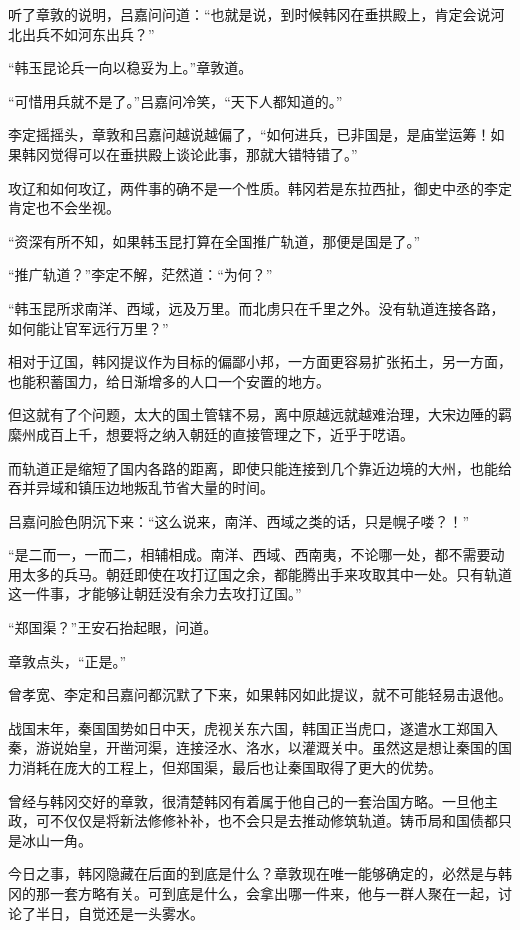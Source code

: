 听了章敦的说明，吕嘉问问道：“也就是说，到时候韩冈在垂拱殿上，肯定会说河北出兵不如河东出兵？”

“韩玉昆论兵一向以稳妥为上。”章敦道。

“可惜用兵就不是了。”吕嘉问冷笑，“天下人都知道的。”

李定摇摇头，章敦和吕嘉问越说越偏了，“如何进兵，已非国是，是庙堂运筹！如果韩冈觉得可以在垂拱殿上谈论此事，那就大错特错了。”

攻辽和如何攻辽，两件事的确不是一个性质。韩冈若是东拉西扯，御史中丞的李定肯定也不会坐视。

“资深有所不知，如果韩玉昆打算在全国推广轨道，那便是国是了。”

“推广轨道？”李定不解，茫然道：“为何？”

“韩玉昆所求南洋、西域，远及万里。而北虏只在千里之外。没有轨道连接各路，如何能让官军远行万里？”

相对于辽国，韩冈提议作为目标的偏鄙小邦，一方面更容易扩张拓土，另一方面，也能积蓄国力，给日渐增多的人口一个安置的地方。

但这就有了个问题，太大的国土管辖不易，离中原越远就越难治理，大宋边陲的羁縻州成百上千，想要将之纳入朝廷的直接管理之下，近乎于呓语。

而轨道正是缩短了国内各路的距离，即使只能连接到几个靠近边境的大州，也能给吞并异域和镇压边地叛乱节省大量的时间。

吕嘉问脸色阴沉下来：“这么说来，南洋、西域之类的话，只是幌子喽？！”

“是二而一，一而二，相辅相成。南洋、西域、西南夷，不论哪一处，都不需要动用太多的兵马。朝廷即使在攻打辽国之余，都能腾出手来攻取其中一处。只有轨道这一件事，才能够让朝廷没有余力去攻打辽国。”

“郑国渠？”王安石抬起眼，问道。

章敦点头，“正是。”

曾孝宽、李定和吕嘉问都沉默了下来，如果韩冈如此提议，就不可能轻易击退他。

战国末年，秦国国势如日中天，虎视关东六国，韩国正当虎口，遂遣水工郑国入秦，游说始皇，开凿河渠，连接泾水、洛水，以灌溉关中。虽然这是想让秦国的国力消耗在庞大的工程上，但郑国渠，最后也让秦国取得了更大的优势。

曾经与韩冈交好的章敦，很清楚韩冈有着属于他自己的一套治国方略。一旦他主政，可不仅仅是将新法修修补补，也不会只是去推动修筑轨道。铸币局和国债都只是冰山一角。

今日之事，韩冈隐藏在后面的到底是什么？章敦现在唯一能够确定的，必然是与韩冈的那一套方略有关。可到底是什么，会拿出哪一件来，他与一群人聚在一起，讨论了半日，自觉还是一头雾水。

